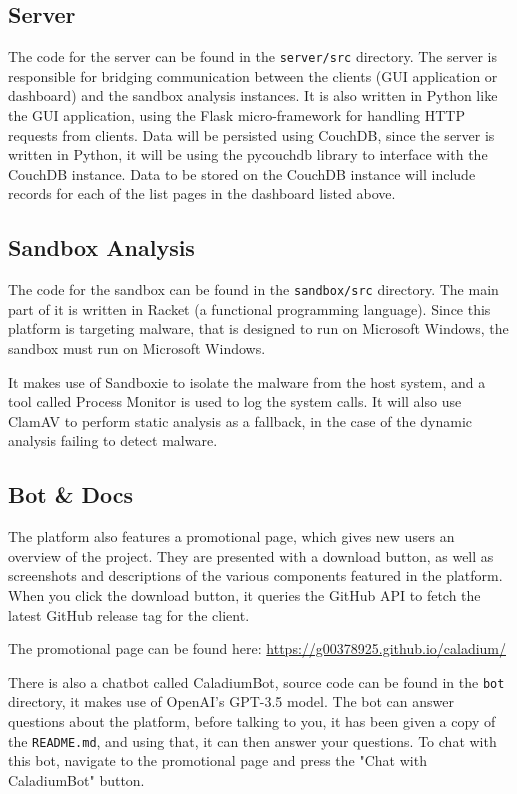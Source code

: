 \subsection{Server}
The code for the server can be found in the \texttt{server/src} directory.
The server is responsible for bridging communication between
the clients (GUI application or dashboard) and the sandbox analysis instances.
It is also written in Python like the GUI application,
using the Flask micro-framework for handling HTTP requests from clients.
Data will be persisted using CouchDB, since the server is written in Python,
it will be using the pycouchdb library to interface with the CouchDB instance.
Data to be stored on the CouchDB instance will include records for
each of the list pages in the dashboard listed above.

\subsection{Sandbox Analysis}
The code for the sandbox can be found in the \texttt{sandbox/src} directory.
The main part of it is written in Racket (a functional programming language).
Since this platform is targeting malware, that is designed to
run on Microsoft Windows, the sandbox must run on Microsoft Windows.

It makes use of Sandboxie to isolate the malware from the host system,
and a tool called Process Monitor is used to log the system calls.
It will also use ClamAV to perform static analysis as a fallback,
in the case of the dynamic analysis failing to detect malware.

\subsection{Bot \& Docs}
The platform also features a promotional page,
which gives new users an overview of the project.
They are presented with a download button,
as well as screenshots and descriptions of
the various components featured in the platform.
When you click the download button,
it queries the GitHub API to fetch the latest
GitHub release tag for the client.

The promotional page can be found here:
\href{https://g00378925.github.io/caladium/}{https://g00378925.github.io/caladium/}

There is also a chatbot called CaladiumBot, source code can be found in the
\texttt{bot} directory, it makes use of OpenAI's GPT-3.5 model. \cite{openai}
The bot can answer questions about the platform,
before talking to you, it has been given a copy of the \texttt{README.md},
and using that, it can then answer your questions.
To chat with this bot, navigate to the promotional page and press the
"Chat with CaladiumBot" button.

